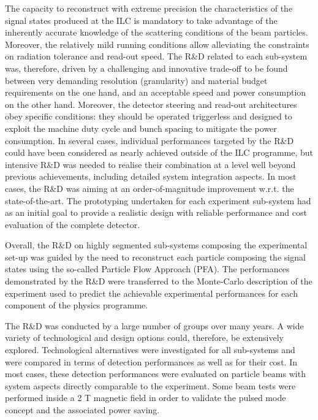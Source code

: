 \documentclass[%
 reprint,
 amsmath,amssymb,
 aps,
]{revtex4-1}
\newcommand{\todo}[1]{\textcolor{red}{{#1}}}
\begin{document}


The capacity to reconstruct with extreme precision the characteristics of the signal states produced at the ILC is mandatory to take advantage of the inherently accurate knowledge of the scattering conditions of the beam particles. Moreover, the relatively mild running conditions allow alleviating the constraints on radiation tolerance and read-out speed. The R\&D related to each sub-system was, therefore, driven by a challenging and innovative trade-off to be found between very demanding resolution (granularity) and material budget requirements on the one hand, and an acceptable speed and power consumption on the other hand. Moreover, the detector steering and read-out architectures obey specific conditions: they should be operated triggerless and designed to exploit the machine duty cycle and bunch spacing to mitigate the power consumption.
In several cases, individual performances targeted by the R\&D could have been considered as nearly achieved outside of the ILC programme, but intensive R\&D was needed to realise their combination at a level well beyond previous achievements, including detailed system integration aspects. In most cases, the R\&D was aiming at an order-of-magnitude improvement w.r.t. the state-of-the-art. The prototyping undertaken for each experiment sub-system had as an initial goal to provide a realistic design with reliable performance and cost evaluation of the complete detector.

Overall, the R\&D on highly segmented sub-systems composing the experimental set-up was guided by the need to reconstruct each particle composing the signal states using the so-called Particle Flow Approach (PFA). The performances demonstrated by the R\&D were transferred to the Monte-Carlo description of the experiment used to predict the achievable experimental performances for each component of the physics programme.

The R\&D was conducted by a large number of groups over many years. A wide variety of technological and design options could, therefore, be extensively explored. Technological alternatives were investigated for all sub-systems and were compared in terms of detection performances as well as for their cost. In most cases, these detection performances were evaluated on particle beams with system aspects directly comparable to the experiment. Some beam tests were performed inside a 2 T magnetic field in order to validate the pulsed mode concept and the associated power saving.
\end{document}
